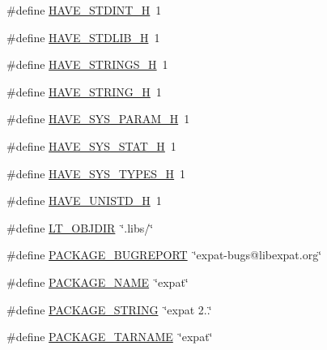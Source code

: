 \begin{DoxyCompactItemize}
\item 
\#define \hyperlink{mac_2config_2i386_2lib-src_2expat_2expat__config_8h_ab6cd6d1c63c1e26ea2d4537b77148354}{H\+A\+V\+E\+\_\+\+S\+T\+D\+I\+N\+T\+\_\+H}~1
\item 
\#define \hyperlink{mac_2config_2i386_2lib-src_2expat_2expat__config_8h_a9e0e434ec1a6ddbd97db12b5a32905e0}{H\+A\+V\+E\+\_\+\+S\+T\+D\+L\+I\+B\+\_\+H}~1
\item 
\#define \hyperlink{mac_2config_2i386_2lib-src_2expat_2expat__config_8h_a405d10d46190bcb0320524c54eafc850}{H\+A\+V\+E\+\_\+\+S\+T\+R\+I\+N\+G\+S\+\_\+H}~1
\item 
\#define \hyperlink{mac_2config_2i386_2lib-src_2expat_2expat__config_8h_ad4c234dd1625255dc626a15886306e7d}{H\+A\+V\+E\+\_\+\+S\+T\+R\+I\+N\+G\+\_\+H}~1
\item 
\#define \hyperlink{mac_2config_2i386_2lib-src_2expat_2expat__config_8h_a05aa9fc25e1231d8eb347390558e4e22}{H\+A\+V\+E\+\_\+\+S\+Y\+S\+\_\+\+P\+A\+R\+A\+M\+\_\+H}~1
\item 
\#define \hyperlink{mac_2config_2i386_2lib-src_2expat_2expat__config_8h_ace156430ba007d19b4348a950d0c692b}{H\+A\+V\+E\+\_\+\+S\+Y\+S\+\_\+\+S\+T\+A\+T\+\_\+H}~1
\item 
\#define \hyperlink{mac_2config_2i386_2lib-src_2expat_2expat__config_8h_a69dc70bea5d1f8bd2be9740e974fa666}{H\+A\+V\+E\+\_\+\+S\+Y\+S\+\_\+\+T\+Y\+P\+E\+S\+\_\+H}~1
\item 
\#define \hyperlink{mac_2config_2i386_2lib-src_2expat_2expat__config_8h_a219b06937831d0da94d801ab13987639}{H\+A\+V\+E\+\_\+\+U\+N\+I\+S\+T\+D\+\_\+H}~1
\item 
\#define \hyperlink{mac_2config_2i386_2lib-src_2expat_2expat__config_8h_ac2d5925d76379847dd9fc4747b061659}{L\+T\+\_\+\+O\+B\+J\+D\+IR}~\char`\"{}.libs/\char`\"{}
\item 
\#define \hyperlink{mac_2config_2i386_2lib-src_2expat_2expat__config_8h_a1d1d2d7f8d2f95b376954d649ab03233}{P\+A\+C\+K\+A\+G\+E\+\_\+\+B\+U\+G\+R\+E\+P\+O\+RT}~\char`\"{}expat-\/bugs@libexpat.\+org\char`\"{}
\item 
\#define \hyperlink{mac_2config_2i386_2lib-src_2expat_2expat__config_8h_a1c0439e4355794c09b64274849eb0279}{P\+A\+C\+K\+A\+G\+E\+\_\+\+N\+A\+ME}~\char`\"{}expat\char`\"{}
\item 
\#define \hyperlink{mac_2config_2i386_2lib-src_2expat_2expat__config_8h_ac73e6f903c16eca7710f92e36e1c6fbf}{P\+A\+C\+K\+A\+G\+E\+\_\+\+S\+T\+R\+I\+NG}~\char`\"{}expat 2..\char`\"{}
\item 
\#define \hyperlink{mac_2config_2i386_2lib-src_2expat_2expat__config_8h_af415af6bfede0e8d5453708afe68651c}{P\+A\+C\+K\+A\+G\+E\+\_\+\+T\+A\+R\+N\+A\+ME}~\char`\"{}expat\char`\"{}

\end{DoxyCompactItemize}
